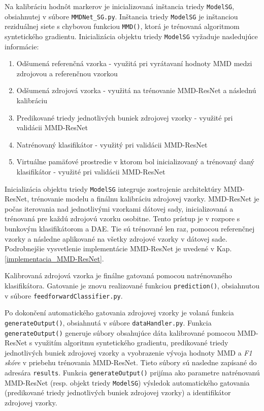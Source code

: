 Na kalibráciu hodnôt markerov je inicializovaná inštancia triedy \texttt{ModelSG}, obsiahnutej v súbore \texttt{MMDNet_SG.py}. Inštancia triedy \texttt{ModelSG} je inštanciou reziduálnej siete s chybovou funkciou \texttt{MMD()}, ktorá je trénovaná algoritmom syntetického gradientu. Inicializácia objektu triedy \texttt{ModelSG} vyžaduje nasledujúce informácie:
\begin{enumerate}
    \item Odšumená referenčná vzorka - využitá pri vyrátavaní hodnoty MMD medzi zdrojovou a referenčnou vzorkou
    \item Odšumená zdrojová vzorka - využitá na trénovanie MMD-ResNet a následnú kalibráciu
    \item Predikované triedy jednotlivých buniek zdrojovej vzorky - využité pri validácii MMD-ResNet
    \item Natrénovaný klasifikátor - využitý pri validácii MMD-ResNet
    \item Virtuálne pamäťové prostredie v ktorom bol inicializovaný a trénovaný daný klasifikátor - využité pri validácii MMD-ResNet
\end{enumerate}
Inicializácia objektu triedy \texttt{ModelSG} integruje zostrojenie architektúry MMD-ResNet, trénovanie modelu a finálnu kalibráciu zdrojovej vzorky. MMD-ResNet je počas iterovania nad jednotlivými vzorkami dátovej sady, inicializovaná a trénovaná pre každú zdrojovú vzorku osobitne. Tento prístup je v rozpore s bunkovým klasifikátorom a DAE. Tie sú trénované len raz, pomocou referenčnej vzorky a následne aplikované na všetky zdrojové vzorky v dátovej sade. Podrobnejšie vysvetlenie implementácie MMD-ResNet je uvedené v Kap. \ref{implementacia_MMD-ResNet}.

Kalibrovaná zdrojová vzorka je finálne gatovaná pomocou natrénovaného klasifikátora. Gatovanie je znovu realizované funkciou \texttt{prediction()}, obsiahnutou v súbore \texttt{feedforwardClassifier.py}.

Po dokončení automatického gatovania zdrojovej vzorky je volaná funkcia \texttt{generateOutput()}, obsiahnutá v súbore \texttt{dataHandler.py}. Funkcia \texttt{generateOutput()} generuje súbory obsahujúce dáta kalibrované pomocou MMD-ResNet s využitím algoritmu syntetického gradientu, predikované triedy jednotlivých buniek zdrojovej vzorky a vyobrazenie vývoja hodnoty MMD a \textit{F1 skóre} v priebehu trénovania MMD-ResNet. Tieto súbory sú nasledne zapísané do adresára \texttt{results}. Funkcia \texttt{generateOutput()} prijíma ako parametre natrénovanú MMD-ResNet (resp. objekt triedy \texttt{ModelSG}) výsledok automatického gatovania (predikované triedy jednotlivých buniek zdrojovej vzorky) a identifikátor zdrojovej vzorky.

